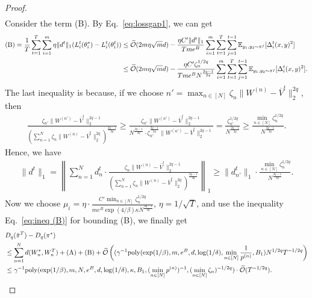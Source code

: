 \begin{proof}
\begin{align}
\end{align}
Consider the term (B). By Eq.~\eqref{eq:lossgap1}, we can get
\begin{align}
    \mathrm{(B)}=\frac{1}{T}\sum_{t=1}^T \sum_{i=1}^m \eta \|d^t\|_1(L_i^t(\theta_i^*) - L_i^t(\theta_i^t)) &\le \widetilde{\mathcal{O}}(2m\eta \sqrt{m}d) - \frac{\eta C' \|d^t\|_1}{Tme^B}\sum_{i=1}^m \sum_{t=1}^T \sum_{j=1}^{t-1}\mathbb{E}_{y_1,y_2\sim \pi^j} [\Delta_i^t(x,y)^2]\nonumber\\
    &\le \widetilde{\mathcal{O}}(2m\eta \sqrt{m}d) - \frac{\eta C' \zeta_n^{{1/2q}}}{Tme^BN^{\frac{2q-1}{2q}}}\sum_{i=1}^m \sum_{t=1}^T \sum_{j=1}^{t-1}\mathbb{E}_{y_1,y_2\sim \pi^j} [\Delta_i^t(x,y)^2].\label{eq:ineq (B)}
\end{align}
The last inequality is because, if we choose $n' = \max_{n \in [N]}\zeta_n \|W^{(n)}-\overline{V}^t\|_2^{2q}$, then 
\begin{align*}
    \frac{\zeta_{n'}\|W^{(n')}- \overline{V}^t\|_2^{2q-1}}{\left(\sum_{n=1}^N \zeta_n\|W^{(n)}- \overline{V}^t\|_2^{2q}\right)^{\frac{2q-1}{2q}}} \ge \frac{\zeta_{n'}\|W^{(n')}- \overline{V}^t\|_2^{2q-1}}{N^{\frac{2q-1}{2q}}\cdot \zeta_{n'}^{\frac{2q-1}{2q}}\|W^{(n')}-\overline{V}^t\|_2^{2q-1}} = \frac{\zeta_{n'}^{1/2q}}{N^{\frac{2q-1}{2q}}}\ge \frac{\min_{n \in [N]}\zeta_n^{1/2q}}{N^{\frac{2q-1}{2q}}}.
\end{align*}
Hence, we have 
\begin{align*}
    \|d^t\|_1 = \left\|\sum_{n=1}^Nd_n^t\cdot \frac{\zeta_n\|W^{(n)}- \overline{V}^t\|_2^{2q-1}}{\left(\sum_{n=1}^N \zeta_n\|W^{(n)}- \overline{V}^t\|_2^{2q}\right)^{\frac{2q-1}{2q}}}\right\|_1 \ge \|d_{n'}^t\|_1\cdot \frac{\min_{n \in [N]}\zeta_n^{1/2q}}{N^{\frac{2q-1}{2q}}}.
\end{align*}
Now we choose $\mu_i = \eta \cdot \frac{C'\min_{n \in [N]}\zeta_n^{1/2q}}{me^B \exp(4/\beta)\kappa N^{\frac{2q-1}{2q}}}$, $\eta = 1/\sqrt{T}$, and use the inequality Eq.~\eqref{eq:ineq (B)} for bounding (B), we finally get 
\begin{align*}
    &D_q(\tilde{\pi}^T)-D_q(\pi^*) \\&\le \sum_{n=1}^N d(W_n^*, W_n^T) + \mathrm{(A)} + \mathrm{(B)} + \widetilde{\mathcal{O}}\left((\gamma^{-1}\mathrm{poly}(\exp(1/\beta), m, e^B, d, \log(1/\delta), \min_{n \in [N]}\frac{1}{p^{(n)}}, B_1)N^{1/2q}T^{-1/2q}\right)\\
    &\le \gamma^{-1}\mathrm{poly}(\exp(1/\beta), m,N,e^B, d, \log(1/\delta),\kappa, B_1, (\min_{n \in [N]}p^{(n)})^{-1}, (\min_{n \in [N]}\zeta_n)^{-1/2q})\cdot \widetilde{\mathcal{O}}(T^{-1/2q}).
\end{align*}

\end{proof}






